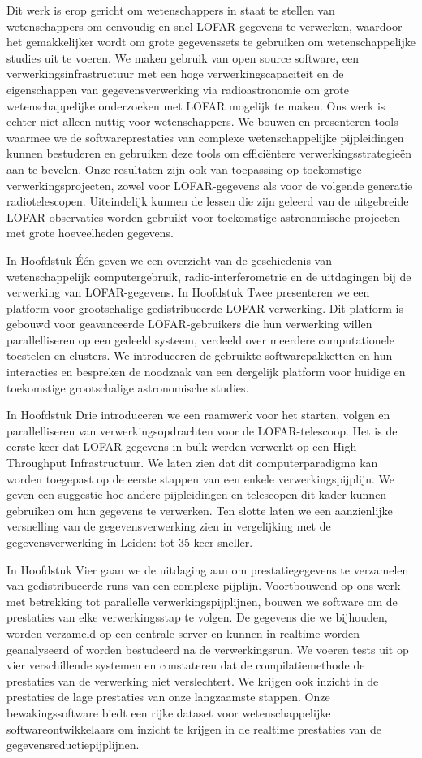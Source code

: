 Dit werk is erop gericht om wetenschappers in staat te stellen van wetenschappers om eenvoudig en snel LOFAR-gegevens te verwerken, waardoor het gemakkelijker wordt om grote gegevenssets te gebruiken om wetenschappelijke studies uit te voeren. We maken gebruik van open source software, een verwerkingsinfrastructuur met een hoge verwerkingscapaciteit en de eigenschappen van gegevensverwerking via radioastronomie om grote wetenschappelijke onderzoeken met LOFAR mogelijk te maken. Ons werk is echter niet alleen nuttig voor wetenschappers. We bouwen en presenteren tools waarmee we de softwareprestaties van complexe wetenschappelijke pijpleidingen kunnen bestuderen en gebruiken deze tools om efficiëntere verwerkingsstrategieën aan te bevelen. Onze resultaten zijn ook van toepassing op toekomstige verwerkingsprojecten, zowel voor LOFAR-gegevens als voor de volgende generatie radiotelescopen. Uiteindelijk kunnen de lessen die zijn geleerd van de uitgebreide LOFAR-observaties worden gebruikt voor toekomstige astronomische projecten met grote hoeveelheden gegevens.

In Hoofdstuk Één geven we een overzicht van de geschiedenis van wetenschappelijk computergebruik, radio-interferometrie en de uitdagingen bij de verwerking van LOFAR-gegevens. In Hoofdstuk Twee presenteren we een platform voor grootschalige gedistribueerde LOFAR-verwerking. Dit platform is gebouwd voor geavanceerde LOFAR-gebruikers die hun verwerking willen parallelliseren op een gedeeld systeem, verdeeld over meerdere computationele toestelen en clusters. We introduceren de gebruikte softwarepakketten en hun interacties en bespreken de noodzaak van een dergelijk platform voor huidige en toekomstige grootschalige astronomische studies.

In Hoofdstuk Drie introduceren we een raamwerk voor het starten, volgen en parallelliseren van verwerkingsopdrachten voor de LOFAR-telescoop. Het is de eerste keer dat LOFAR-gegevens in bulk werden verwerkt op een High Throughput Infrastructuur. We laten zien dat dit computerparadigma kan worden toegepast op de eerste stappen van een enkele verwerkingspijplijn. We geven een suggestie hoe andere pijpleidingen en telescopen dit kader kunnen gebruiken om hun gegevens te verwerken. Ten slotte laten we een aanzienlijke versnelling van de gegevensverwerking zien in vergelijking met de gegevensverwerking in Leiden: tot 35 keer sneller.

In Hoofdstuk Vier gaan we de uitdaging aan om prestatiegegevens te verzamelen van gedistribueerde runs van een complexe pijplijn.  Voortbouwend op ons werk met betrekking tot parallelle verwerkingspijplijnen, bouwen we software om de prestaties van elke verwerkingsstap te volgen. De gegevens die we bijhouden, worden verzameld op een centrale server en kunnen in realtime worden geanalyseerd of worden bestudeerd na de verwerkingsrun. We voeren tests uit op vier verschillende systemen en constateren dat de compilatiemethode de prestaties van de verwerking niet verslechtert. We krijgen ook inzicht in de prestaties de lage prestaties van onze langzaamste stappen. Onze bewakingssoftware biedt een rijke dataset voor wetenschappelijke softwareontwikkelaars om inzicht te krijgen in de realtime prestaties van de gegevensreductiepijplijnen.

